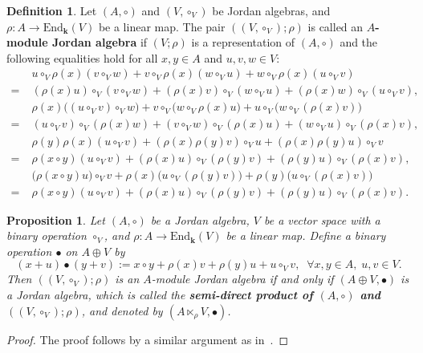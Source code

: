 \documentclass[12pt, reqno, a4paper]{amsart}
\newtheorem{proposition}[theorem]{Proposition}
\theoremstyle{definition}
\newtheorem{definition}[theorem]{Definition}
\newcommand{\End}{\mathrm{End}}
\begin{document}
\begin{definition}
	Let $(A, \circ)$ and $(V, \circ_V)$ be Jordan algebras, and $\rho: A \to \End_{\mathbf{k}}(V)$ be a linear map.
	The pair $((V, \circ_V); \rho)$ is called an \textbf{$A$-module Jordan algebra} if $(V; \rho)$ is a representation of $(A, \circ)$ and the following equalities hold for all $x, y \in A$ and $u, v, w \in V$:
	\begin{align}
		& u \circ_V \rho(x)(v \circ_V w) + v \circ_V \rho(x)(w \circ_V u) + w \circ_V \rho(x)(u \circ_V v) \nonumber \\
		=\; & (\rho(x)u) \circ_V (v \circ_V w) + (\rho(x)v) \circ_V (w \circ_V u) + (\rho(x)w) \circ_V (u \circ_V v), \label{Ajord1} \\
		& \rho(x)\big((u \circ_V v) \circ_V w\big) + v \circ_V \big(w \circ_V \rho(x)u\big) + u \circ_V \big(w \circ_V (\rho(x)v)\big) \nonumber \\
		=\; & (u \circ_V v) \circ_V (\rho(x)w) + (v \circ_V w) \circ_V (\rho(x)u) + (w \circ_V u) \circ_V (\rho(x)v),\label{Ajord2} \\
		& \rho(y)\rho(x)(u \circ_V v) + (\rho(x)\rho(y)v) \circ_V u + (\rho(x)\rho(y)u) \circ_V v \nonumber \\
		=\; & \rho(x \circ y)(u \circ_V v) + (\rho(x)u) \circ_V (\rho(y)v) + (\rho(y)u) \circ_V (\rho(x)v), \label{Ajord3} \\
		& \big(\rho(x \circ y)u\big) \circ_V v + \rho(x)\big(u \circ_V (\rho(y)v)\big) + \rho(y)\big(u \circ_V (\rho(x)v)\big) \nonumber \\
		=\; & \rho(x \circ y)(u \circ_V v) + (\rho(x)u) \circ_V (\rho(y)v) + (\rho(y)u) \circ_V (\rho(x)v). \label{Ajord4}
	\end{align}
\end{definition}

\begin{proposition}
	Let $(A, \circ)$ be a Jordan algebra, $V$ be a vector space with a binary operation $\circ_V$, and $\rho: A \to \End_{\mathbf{k}}(V)$ be a linear map.
	Define a binary operation $\bullet$ on $A \oplus V$ by
	\begin{equation*}
		(x + u) \bullet (y + v) := x \circ y + \rho(x) v + \rho(y) u + u \circ_V v, \;\; \forall x, y \in A, \; u, v \in V.
	\end{equation*}
	Then $((V, \circ_V); \rho)$ is an $A$-module Jordan algebra if and only if $(A \oplus V, \bullet)$ is a Jordan algebra, which is called the \textbf{semi-direct product of $(A, \circ)$ and $((V, \circ_V); \rho)$}, and denoted by $(A \ltimes_{\rho} V, \bullet)$.
\end{proposition}
\begin{proof}
	The proof follows by a similar argument as in~\cite[Theorem 2.10]{hou2022new}.
\end{proof}
\end{document}
